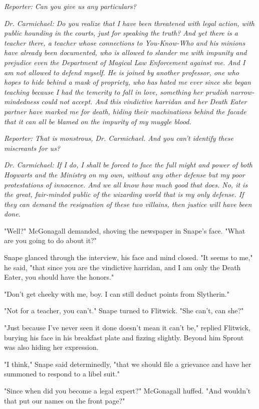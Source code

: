 \emph{Reporter: Can you give us any particulars?}

\emph{Dr. Carmichael: Do you realize that I have been threatened with legal action, with public hounding in the courts, just for speaking the truth? And yet there is a teacher there, a teacher whose connections to You-Know-Who and his minions have already been documented, who is allowed to slander me with impunity and prejudice even the Department of Magical Law Enforcement against me. And I am not allowed to defend myself. He is joined by another professor, one who hopes to hide behind a mask of propriety, who has hated me ever since she began teaching because I had the temerity to fall in love, something her prudish narrow-mindedness could not accept. And this vindictive harridan and her Death Eater partner have marked me for death, hiding their machinations behind the facade that it can all be blamed on the impurity of my muggle blood.}

\emph{Reporter: That is monstrous, Dr. Carmichael. And you can't identify these miscreants for us?}

\emph{Dr. Carmichael: If I do, I shall be forced to face the full might and power of both Hogwarts and the Ministry on my own, without any other defense but my poor protestations of innocence. And we all know how much good that does. No, it is the great, fair-minded public of the wizarding world that is my only defense. If they can demand the resignation of these two villains, then justice will have been done.}

"Well?" McGonagall demanded, shoving the newspaper in Snape's face. "What are you going to do about it?"

Snape glanced through the interview, his face and mind closed. "It seems to me," he said, "that since you are the vindictive harridan, and I am only the Death Eater, you should have the honors."

"Don't get cheeky with me, boy. I can still deduct points from Slytherin."

"Not for a teacher, you can't." Snape turned to Flitwick. "She can't, can she?"

"Just because I've never seen it done doesn't mean it can't be," replied Flitwick, burying his face in his breakfast plate and fizzing slightly. Beyond him Sprout was also hiding her expression.

"I think," Snape said determinedly, "that we should file a grievance and have her summoned to respond to a libel suit."

"Since when did you become a legal expert?" McGonagall huffed. "And wouldn't that put our names on the front page?"

